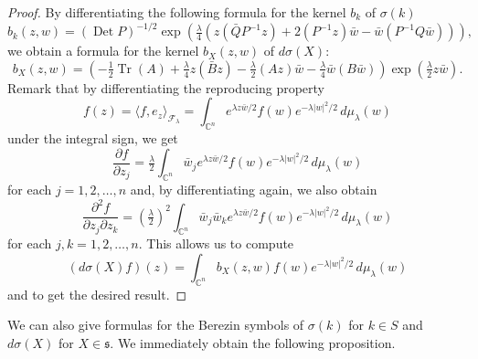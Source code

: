 \documentclass[12pt]{amsart}
\numberwithin{equation}{section}
\DeclareMathOperator{\Det}{Det} \DeclareMathOperator{\Tr}{Tr}
\begin{document}
\begin{proof} By differentiating the following formula for the kernel $b_k$ of $\sigma(k)$
\begin{equation*} b_k(z,w)=(\Det P)^{-1/2}\exp \left(\tfrac{\lambda}{4}\left(
z({\bar Q}P^{-1}z)+2(P^{-1}z){\bar w}-{\bar w}(P^{-1}Q{\bar w})\right)\right),
\end{equation*}
we obtain a formula for the kernel $b_X(z,w)$ of $d\sigma(X)$:
\begin{equation*} b_X(z,w)=\left(-\tfrac{1}{2}\Tr(A)+\tfrac{\lambda}{4}z({\bar B}z)-
\tfrac{\lambda}{2}(Az){\bar w}-\tfrac{\lambda}{4}{\bar w}(B{\bar w})\right)\exp \left(\tfrac{\lambda}{2}z{\bar w}\right).\end{equation*}
Remark that by differentiating the reproducing property
\begin{equation*}f(z)=\langle f,e_z\rangle_{\mathcal F_{\lambda}}=
\int_{{\mathbb C}^n} e^{\lambda z{\bar w}/2}f(w)e^{-{\lambda} \vert
w\vert^2/2}\,d\mu_{\lambda} (w)\end{equation*} under the integral sign,
we get
\begin{equation*}\frac{\partial f}{\partial z_j}=\tfrac{\lambda}{2}
\int_{{\mathbb C}^n} {\bar w_j}e^{\lambda z{\bar w}/2}f(w)e^{-\lambda \vert
w\vert^2/2}\,d\mu_{\lambda} (w)\end{equation*} for each $j=1,2,\ldots,n$ and,
by differentiating again, we also obtain
\begin{equation*}\frac{\partial^2f}{\partial z_j\partial z_k}=\left(\tfrac{\lambda}{2}\right)^2
\int_{{\mathbb C}^n} {\bar w_j}{\bar w_k}e^{{\lambda} z{\bar w}/2}f(w)e^{-\lambda \vert
w\vert^2/2}\,d\mu_{\lambda} (w)\end{equation*} for each $j,k=1,2,\ldots,n$.
This allows us to compute
\begin{equation*}(d\sigma (X)f)(z)=\int_{{\mathbb C}^n}b_X(z,w)f(w)e^{-{\lambda} \vert
w\vert^2/2}\,d\mu_{\lambda} (w)\end{equation*} and to get the desired result.
\end{proof}

We can also give formulas for the Berezin symbols of $\sigma(k)$ for $k\in S$ and 
$d\sigma(X)$ for $X\in {\mathfrak s}$. We immediately obtain the following proposition.
\end{document}

